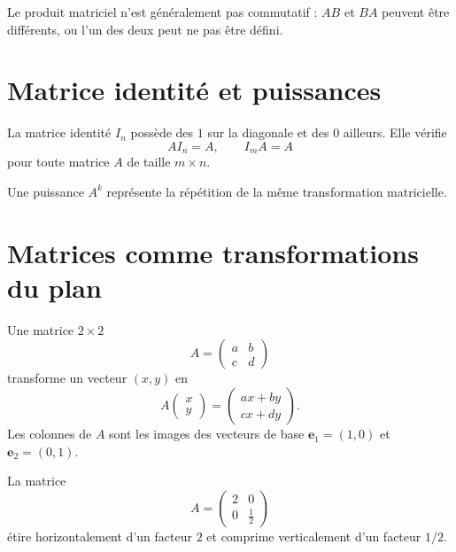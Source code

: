 \documentclass[12pt,a4paper,openany]{book}
\begin{document}
\begin{warningbox}
Le produit matriciel n'est généralement pas commutatif : $AB$ et $BA$ peuvent être différents, ou l'un des deux peut ne pas être défini.
\end{warningbox}

\section{Matrice identité et puissances}

La matrice identité $I_n$ possède des $1$ sur la diagonale et des $0$ ailleurs. Elle vérifie
\[
AI_n=A,
\qquad I_mA=A
\]
pour toute matrice $A$ de taille $m\times n$.

Une puissance $A^k$ représente la répétition de la même transformation matricielle.

\section{Matrices comme transformations du plan}

Une matrice $2\times2$
\[
A=\begin{pmatrix}a&b\\c&d\end{pmatrix}
\]
transforme un vecteur $(x,y)$ en
\[
A\begin{pmatrix}x\\y\end{pmatrix}
=
\begin{pmatrix}ax+by\\cx+dy\end{pmatrix}.
\]
Les colonnes de $A$ sont les images des vecteurs de base $\mathbf e_1=(1,0)$ et $\mathbf e_2=(0,1)$.

\begin{examplebox}
La matrice
\[
A=\begin{pmatrix}2&0\\0&\frac12\end{pmatrix}
\]
étire horizontalement d'un facteur $2$ et comprime verticalement d'un facteur $1/2$.
\end{examplebox}

\begin{center}
\end{center}
\end{document}
